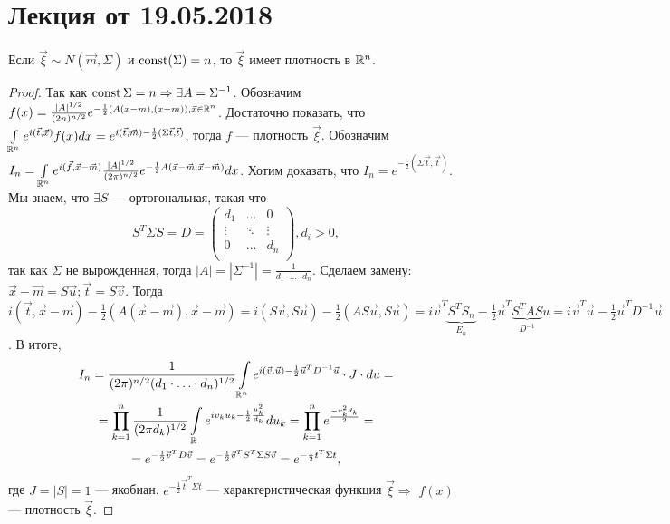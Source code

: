 \section{Лекция от 19.05.2018}
\begin{property}
	Если $\vec \xi \sim N(\vec m, \Sigma)$ и $\operatorname{const}(\Sigma) = n$, то $\vec \xi$ имеет плотность в $\mathbb{R}^n$.
	\begin{proof}
		Так как $\operatorname{const} \Sigma = n \Rightarrow \exists A = \Sigma^{-1}$. Обозначим $f(x) = \frac{|A|^{1/2}}{(2n)^{n / 2}} e^{-\frac{1}{2}(A(x - m), (x - m)), \vec x \in \mathbb{R}^n}$. Достаточно показать, что $\int\limits_{\mathbb{R}^n}e^{i(\vec t, \vec x)}f(x)dx = e^{i(\vec t, \vec m) - \frac{1}{2}(\Sigma \vec t, \vec t)}$, тогда $f$ --- плотность $\vec \xi$. Обозначим $I_n = \int\limits_{\mathbb{R}^n}e^{i(\vec f, \vec x - \vec m)} \frac{|A|^{1/2}}{(2\pi)^{n/2}}e^{-\frac{1}{2}A(\vec x - \vec m, \vec x - \vec m)}dx$. Хотим доказать, что $I_n = e^{-\frac{1}{2}(\Sigma\vec t, \vec t)}$. Мы знаем, что $\exists S$ --- ортогональная, такая что 
		$$ S^T\Sigma S = D = \left(\begin{matrix}
		d_1 & \ldots & 0 \\
		\vdots & \ddots & \vdots \\
		0 & \ldots & d_n \\
		\end{matrix}\right), d_i > 0, $$ 
		так как $\Sigma$ не вырожденная, тогда $|A| = |\Sigma^{-1}| = \frac{1}{d_1\cdot\ldots\cdot d_n}$. Сделаем замену: $\vec x - \vec m = S\vec u; \vec t = S\vec v$. Тогда $i(\vec t, \vec x - \vec m) - \frac{1}{2}(A(\vec x - \vec m), \vec x - \vec m) = i(S\vec v, S\vec u) - \frac{1}{2}(AS\vec u, S\vec u) = i\vec v^T\underbrace{S^TS_n}_{E_n} - \frac{1}{2}\vec u^T\underbrace{S^TAS}_{D^{-1}}u = i\vec v^T \vec u - \frac{1}{2}\vec u^TD^{-1}\vec u$. В итоге, 
		\begin{multline*}
		I_n = \frac{1}{(2\pi)^{n/2}(d_1 \cdot\ldots\cdot d_n)^{1/2}}\int\limits_{\mathbb{R}^n} e^{i(\vec v, \vec u)- \frac{1}{2}\vec u^TD^{-1}\vec u} \cdot J  \cdot du = \\
		= \prod\limits_{k = 1}^n\frac{1}{(2\pi d_k)^{1/2}} \int\limits_{\mathbb{R}} e^{i v_ku_k - \frac{1}{2}\frac{u_k^2}{d_k}}du_k = \prod\limits_{k = 1}^n e^{\frac{-v_k^2d_k}{2}} =  \\
		= e^{-\frac{1}{2}\vec v^TD\vec v} = e^{-\frac{1}{2}\vec v^TS^T\Sigma S\vec v} = e^{-\frac{1}{2}\vec t^T \Sigma t},
		\end{multline*} где $J = |S| = 1$ --- якобиан.  $e^{-\frac{1}{2}\vec t^T \Sigma t}$ --- характеристическая функция $\vec \xi \Rightarrow$ $f(x)$ --- плотность $\vec \xi$.
	\end{proof}
\end{property}
